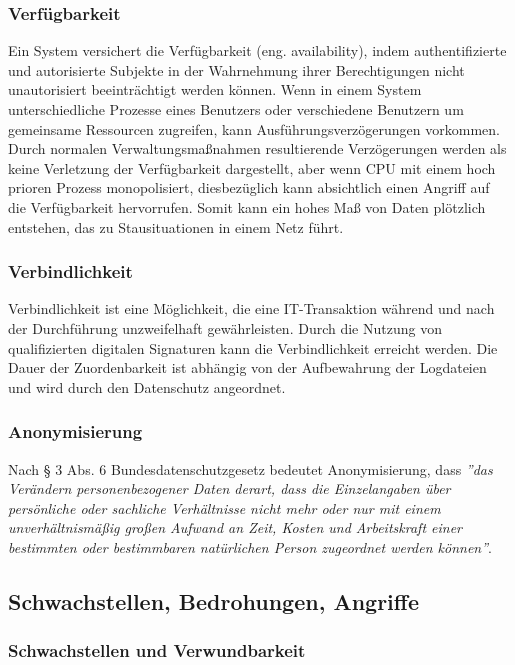 \subsubsection{Verfügbarkeit}

Ein System versichert die Verfügbarkeit (eng. availability), indem authentifizierte und autorisierte Subjekte in der Wahrnehmung ihrer Berechtigungen nicht unautorisiert beeinträchtigt werden können. Wenn in einem System unterschiedliche Prozesse eines Benutzers oder verschiedene Benutzern um gemeinsame Ressourcen zugreifen, kann Ausführungsverzögerungen vorkommen. Durch normalen Verwaltungsmaßnahmen resultierende Verzögerungen werden als keine Verletzung der Verfügbarkeit dargestellt, aber wenn CPU mit einem hoch prioren Prozess monopolisiert, diesbezüglich kann absichtlich einen Angriff auf die Verfügbarkeit hervorrufen. Somit kann ein hohes Maß von Daten plötzlich entstehen, das zu Stausituationen in einem Netz führt\cite[33]{eckert2013sicherheit}.

\subsubsection{Verbindlichkeit}

Verbindlichkeit ist eine Möglichkeit, die eine IT-Transaktion während und nach der Durchführung unzweifelhaft gewährleisten. Durch die Nutzung von qualifizierten digitalen Signaturen kann die Verbindlichkeit erreicht werden. Die Dauer der Zuordenbarkeit ist abhängig von der Aufbewahrung der Logdateien und wird durch den Datenschutz angeordnet\cite{secupedia11}.

\subsubsection{Anonymisierung}

Nach § 3 Abs. 6 Bundesdatenschutzgesetz bedeutet Anonymisierung, dass \emph{''das Verändern personenbezogener Daten derart, dass die Einzelangaben über persönliche oder sachliche Verhältnisse nicht mehr oder nur mit einem unverhältnismäßig großen Aufwand an Zeit, Kosten und Arbeitskraft einer bestimmten oder bestimmbaren natürlichen Person zugeordnet werden können''}\cite{dsba2018}. 

\subsection{Schwachstellen, Bedrohungen, Angriffe}

\subsubsection{Schwachstellen und Verwundbarkeit}

